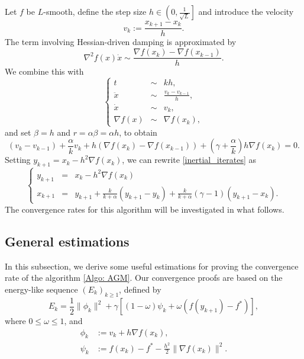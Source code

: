 \documentclass[onefignum,onetabnum]{siamart220329}
\begin{document}
Let $f$ be $L$-smooth, define the step size $h\in\left(0,\frac{1}{\sqrt{L}}\right]$ and introduce the velocity
$$ v_k := \frac{x_{k+1}-x_k}{h}. $$
The term involving Hessian-driven damping is approximated by
$$\nabla^2 f(x)\dot{x} \sim \frac{\nabla f(x_k) - \nabla f(x_{k-1})}{h}.$$
We combine this with
\begin{equation*}
\left\{
\begin{array}{ccl}
t &\sim& kh,\\
\ddot{x} &\sim& \frac{v_k - v_{k-1}}{h},\\
\dot{x} &\sim& v_k,\\
\nabla f(x) &\sim& \nabla f(x_k), 
\end{array}
\right.
\end{equation*}
and set $\beta=h$ and $r=\alpha\beta=\alpha h$, to obtain
\begin{equation}\label{inertial_iterates}
( v_k - v_{k-1} ) + \frac{\alpha}{k}v_k + h\left( \nabla f(x_k) - \nabla f(x_{k-1}) \right) + \left( \gamma + \frac{\alpha}{k} \right) h \nabla f(x_k) = 0.
\end{equation}
Setting $y_{k+1} = x_k - h^2\nabla f(x_k)$, we can rewrite \eqref{inertial_iterates} as
\begin{equation}\label{Algo: AGM}\tag{AGM}
\left\{\begin{array}{ccl}
y_{k+1} &=& x_k - h^2\nabla f(x_k) \\
x_{k+1} &=& y_{k+1} + \frac{k}{k+\alpha}\left( y_{k+1} - y_k \right) + \frac{k}{k+\alpha}(\gamma-1) ( y_{k+1} - x_k ).
\end{array}
\right.
\end{equation}
The convergence rates for this algorithm will be investigated in what follows.




\subsection{General estimations}
In this subsection, we derive some useful estimations for proving the convergence rate of the algorithm \eqref{Algo: AGM}. Our convergence proofs are based on the energy-like sequence $(E_k)_{k\ge 1}$, defined by
\begin{equation}\label{E: E_k}
E_k = \frac{1}{2}\| \phi_k \|^2 + \gamma\left[ (1-\omega)\psi_k + \omega\left( f(y_{k+1})-f^* \right) \right],
\end{equation}
where $0\le\omega\le 1$, and
\begin{align*}
\phi_k &:= v_k + h\nabla f(x_k),\\
\psi_k &:= f(x_k) - f^* - \frac{h^2}{2}\| \nabla f(x_k) \|^2.
\end{align*}
\end{document}
